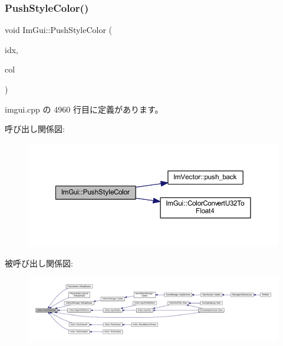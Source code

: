 \mbox{\label{namespace_im_gui_a77ee84afb636e05eb4b2d6eeddcc2aa8}} 
\subsubsection{\texorpdfstring{Push\+Style\+Color()}{PushStyleColor()}\hspace{0.1cm}{\footnotesize\ttfamily [1/2]}}
{\footnotesize\ttfamily void Im\+Gui\+::\+Push\+Style\+Color (\begin{DoxyParamCaption}\item[{\mbox{\hyperlink{imgui_8h_a1b0467ec582e731ae6292fef726fb5fe}{Im\+Gui\+Col}}}]{idx,  }\item[{\mbox{\hyperlink{imgui_8h_a118cff4eeb8d00e7d07ce3d6460eed36}{Im\+U32}}}]{col }\end{DoxyParamCaption})}



 imgui.\+cpp の 4960 行目に定義があります。

呼び出し関係図\+:\nopagebreak
\begin{figure}[H]
\begin{center}
\leavevmode
\includegraphics[width=350pt]{namespace_im_gui_a77ee84afb636e05eb4b2d6eeddcc2aa8_cgraph}
\end{center}
\end{figure}
被呼び出し関係図\+:
\nopagebreak
\begin{figure}[H]
\begin{center}
\leavevmode
\includegraphics[width=350pt]{namespace_im_gui_a77ee84afb636e05eb4b2d6eeddcc2aa8_icgraph}
\end{center}
\end{figure}
\mbox{\label{namespace_im_gui_a5bd052ebf55015312a53739974950e7b}} 

